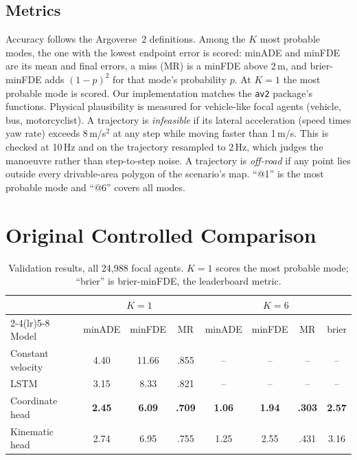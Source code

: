 \documentclass[conference]{IEEEtran}
\begin{document}
\subsection{Metrics}
Accuracy follows the Argoverse~2 definitions. Among the $K$ most probable modes, the one with the
lowest endpoint error is scored: minADE and minFDE are its mean and final errors, a miss (MR) is a
minFDE above 2\,m, and brier-minFDE adds $(1-p)^2$ for that mode's probability $p$. At $K{=}1$ the
most probable mode is scored. Our implementation matches the \texttt{av2} package's functions.
Physical plausibility is measured for vehicle-like focal agents (vehicle, bus, motorcyclist). A
trajectory is \emph{infeasible} if its lateral acceleration (speed times yaw rate) exceeds
8\,m/s$^2$ at any step while moving faster than 1\,m/s. This is checked at 10\,Hz and on the
trajectory resampled to 2\,Hz, which judges the manoeuvre rather than step-to-step noise. A
trajectory is \emph{off-road} if any point lies outside every drivable-area polygon of the
scenario's map. ``@1'' is the most probable mode and ``@6'' covers all modes.

\section{Original Controlled Comparison}

\begin{table}[t]
\centering
\caption{Validation results, all 24,988 focal agents. $K{=}1$ scores the most probable mode;
``brier'' is brier-minFDE, the leaderboard metric.}
\label{tab:main}
\footnotesize
\setlength{\tabcolsep}{2.3pt}
\begin{tabular}{lccccccc}
\toprule
& \multicolumn{3}{c}{$K{=}1$} & \multicolumn{4}{c}{$K{=}6$} \\
\cmidrule(lr){2-4}\cmidrule(lr){5-8}
Model & minADE & minFDE & MR & minADE & minFDE & MR & brier \\
\midrule
Constant velocity & 4.40 & 11.66 & .855 & -- & -- & -- & -- \\
LSTM~\cite{hochreiter1997lstm} & 3.15 & 8.33 & .821 & -- & -- & -- & -- \\
Coordinate head & \textbf{2.45} & \textbf{6.09} & \textbf{.709} & \textbf{1.06} & \textbf{1.94} & \textbf{.303} & \textbf{2.57} \\
Kinematic head & 2.74 & 6.95 & .755 & 1.25 & 2.55 & .431 & 3.16 \\
\bottomrule
\end{tabular}
\end{table}
\end{document}
